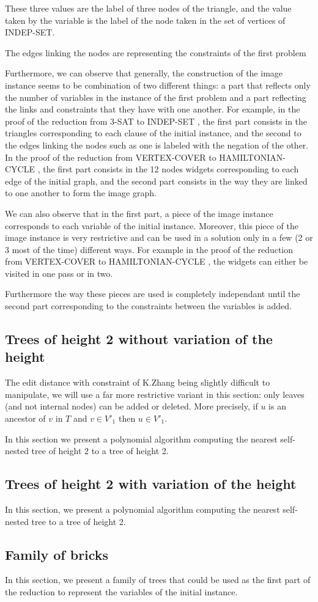 These three values are the label of three nodes of the
triangle, and the value taken by the variable is the label of the node
taken in the set of vertices of INDEP-SET.

The edges linking the nodes are representing
the constraints of the first problem

Furthermore, we can observe that generally, the construction of the
image instance seems to be combination of two different things: a part
that reflects only the number of variables in the instance of the
first problem and a part reflecting the links and constraints that
they have with one another.  For example, in the proof of the
reduction from 3-SAT to INDEP-SET \cite{polytech}, the first part
consists in the triangles corresponding to each clause of the initial
instance, and the second to the edges linking the nodes such as one is
labeled with the negation of the other. In the proof of the reduction
from VERTEX-COVER to HAMILTONIAN-CYCLE \cite{polytech}, the first part
consists in the 12 nodes widgets corresponding to each edge of the
initial graph, and the second part consists in the way they are linked
to one another to form the image graph.

We can also observe that in the first part, a piece of the image
instance corresponds to each variable of the initial
instance. Moreover, this piece of the image instance is very
restrictive and can be used in a solution only in a few (2 or 3 most
of the time) different ways. For example in the proof of the reduction
from VERTEX-COVER to HAMILTONIAN-CYCLE \cite{polytech}, the widgets
can either be visited in one pass or in two.

Furthermore the way these pieces are used is completely independant
until the second part corresponding to the constraints between the
variables is added.

\subsection{Trees of height 2 without variation of the height}
The edit distance with constraint of K.Zhang being slightly difficult
to manipulate, we will use a far more restrictive variant in this
section: only leaves (and not internal nodes) can be added or
deleted. More precisely, if $u$ is an ancestor of $v$ in $T$ and
$v \in V'_{1}$ then $u \in V'_{1}$.

In this section we present a polynomial algorithm computing the
nearest self-nested tree of height 2 to a tree of height 2.

\subsection{Trees of height 2 with variation of the height}
In this section, we present a polynomial algorithm computing the nearest
self-nested tree to a tree of height 2.

\subsection{Family of bricks}
In this section, we present a family of trees that could be used as
the first part of the reduction to represent the variables of the
initial instance.